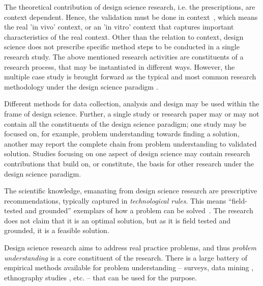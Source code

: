\documentclass[graybox]{svmult}
\begin{document}
The theoretical contribution of design science research, i.e. the prescriptions, are context dependent. Hence, the validation must be done in context~\cite{wieringa_what_2014}, which means the real 'in vivo' context, or an 'in vitro' context that captures important characteristics of the real context.  Other than the relation to context, design science does not prescribe specific %
method steps to be conducted in a single research study. The above mentioned research activities are constituents of  a research process, that may be instantiated in different ways. However, the multiple case study is brought forward as the typical and most common research methodology under the design science paradigm  \cite{van_aken_management_2004}.

Different methods for data collection, analysis and design may be used within the frame of design science. Further, a single study or research paper may or may not contain all the constituents of the design science paradigm; one study may be focused on, for example,  problem understanding towards finding a solution, another may report the complete chain from problem understanding to validated solution. Studies focusing on one aspect of design science may contain research contributions that build on, or constitute, the basis for other research under the design science paradigm.

The scientific knowledge, emanating from design science research are prescriptive recommendations, typically captured in \emph{technological rules}. This means ``field-tested and grounded'' exemplars of how a problem can be solved~\cite{van_aken_management_2004}. The research does not claim that it is an optimal solution, but as it is field tested and grounded, it is a feasible solution.

Design science research aims to address real practice problems, and thus \emph{problem understanding} is a core constituent of the research. There is a large battery of empirical methods available for problem understanding -- surveys, data mining \cite{MenziesDataMining2016}, ethnography studies \cite{SharpEthnography2016}, etc. -- that can be used for the purpose. 
\end{document}
